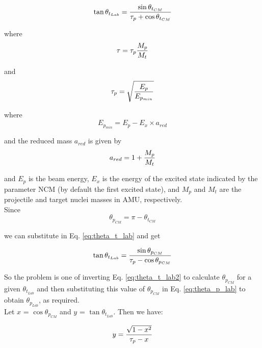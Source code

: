 \begin{equation}
\tan \theta_{t_{Lab}} =  {\sin \theta_{t_{CM}} \over
\tau_p + \cos \theta_{t_{CM}}}
\label{eq:theta_t_lab}
\end{equation}

where
\begin{equation}
\tau = \tau_p {M_p \over M_t}
\end{equation}

and
\begin{equation}
\tau_p = \sqrt{E_p \over E_{p_{min}}}
\end{equation}

where
\begin{equation}
E_{p_{min}} = E_p - E_x \times a_{red}
\end{equation}

and the reduced mass $a_{red}$ is given by
\begin{equation}
a_{red} = 1 + {M_p \over M_t}
\end{equation}

and $E_p$ is the beam energy, $E_x$ is the energy of the excited state
indicated by the parameter NCM (by default the first excited state), and
$M_p$ and $M_t$ are the projectile and target nuclei masses in AMU,
respectively.\\

Since
\begin{equation}
\theta_{p_{CM}} = \pi - \theta_{t_{CM}}
\end{equation}

we can substitute in Eq. \ref{eq:theta_t_lab} and get

\begin{equation}
\tan \theta_{t_{Lab}} =  {\sin \theta_{p_{CM}} \over
\tau_p - \cos \theta_{p_{CM}}}
\label{eq:theta_t_lab2}
\end{equation}


So the problem is one of inverting Eq. \ref{eq:theta_t_lab2} to calculate
$\theta_{p_{CM}}$ for a given $\theta_{t_{Lab}}$ and then substituting this
value of $\theta_{p_{CM}}$ in Eq. \ref{eq:theta_p_lab} to obtain
$\theta_{p_{Lab}}$, as required.\\

Let $x$ = $\cos \theta_{p_{CM}}$ and $y$ = $\tan \theta_{t_{Lab}}$. Then we
have:

\begin{equation}
y =  {\sqrt{1 - x^2} \over \tau_p - x}
\label{eq:theta_t_lab3}
\end{equation}

